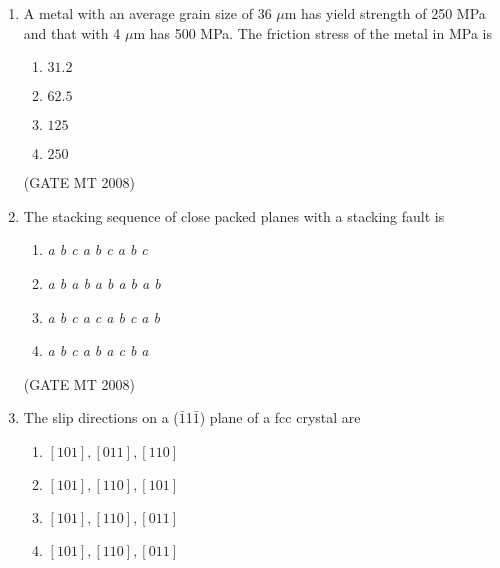 \documentclass[journal, 11pt, onecolumn]{IEEEtran}
\theoremstyle{remark}
\begin{document}
\begin{enumerate}
\begin{multicols}{2}
\begin{enumerate}
\item elutriation velocity
\item terminal velocity
\item minimum fluidization velocity
\item superficial velocity
\end{enumerate}
\end{multicols}

\hfill(GATE MT 2008)

\item A metal with an average grain size of 36 $\mu$m has yield strength of 250 MPa and that with 4 $\mu$m has 500 MPa. The friction stress of the metal in MPa is

\begin{multicols}{4}
\begin{enumerate}
\item $31.2$
\item $62.5$
\item $125$
\item $250$
\end{enumerate}
\end{multicols}

\hfill(GATE MT 2008)

\item The stacking sequence of close packed planes with a stacking fault is

\begin{multicols}{2}
\begin{enumerate}
\item \textit{a b c a b c a b c}
\item \textit{a b a b a b a b a b}
\item \textit{a b c a c a b c a b}
\item \textit{a b c a b a c b a}
\end{enumerate}
\end{multicols}

\hfill(GATE MT 2008)

\item The slip directions on a ($\bar{1}$1$\bar{1}$) plane of a fcc crystal are

\begin{multicols}{2}
\begin{enumerate}
\item $[101], [011], [110]$
\item $[101], [110], [101]$
\item $[101], [110], [011]$
\item $[101], [110], [011]$
\end{enumerate}
\end{multicols}


\end{enumerate}
\end{document}
